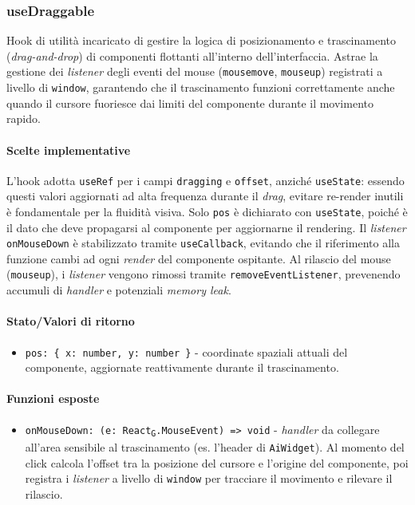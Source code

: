 \documentclass[11pt,a4paper]{article}
\newcommand{\gls}[1]{#1\textsubscript{G}}
\begin{document}
\subsubsection{useDraggable}
Hook di utilità incaricato di gestire la logica di posizionamento e trascinamento (\textit{drag-and-drop}) di componenti flottanti all'interno dell'interfaccia. Astrae la gestione dei \textit{listener} degli eventi del mouse (\texttt{mousemove}, \texttt{mouseup}) registrati a livello di \texttt{window}, garantendo che il trascinamento funzioni correttamente anche quando il cursore fuoriesce dai limiti del componente durante il movimento rapido.

\paragraph{Scelte implementative}
L'hook adotta \texttt{useRef} per i campi \texttt{dragging} e \texttt{offset}, anziché \texttt{useState}: essendo questi valori aggiornati ad alta frequenza durante il \textit{drag}, evitare re-render inutili è fondamentale per la fluidità visiva. Solo \texttt{pos} è dichiarato con \texttt{useState}, poiché è il dato che deve propagarsi al componente per aggiornarne il rendering. Il \textit{listener} \texttt{onMouseDown} è stabilizzato tramite \texttt{useCallback}, evitando che il riferimento alla funzione cambi ad ogni \textit{render} del componente ospitante. Al rilascio del mouse (\texttt{mouseup}), i \textit{listener} vengono rimossi tramite \texttt{removeEventListener}, prevenendo accumuli di \textit{handler} e potenziali \textit{memory leak}.

\paragraph{Stato/Valori di ritorno}
\begin{itemize}
    \item \texttt{pos: \{ x: number, y: number \}} - coordinate spaziali attuali del componente, aggiornate reattivamente durante il trascinamento.
\end{itemize}

\paragraph{Funzioni esposte}
\begin{itemize}
    \item \texttt{onMouseDown: (e: \gls{React}.MouseEvent) => void} - \textit{handler} da collegare all'area sensibile al trascinamento (es. l'header di \texttt{AiWidget}). Al momento del click calcola l'offset tra la posizione del cursore e l'origine del componente, poi registra i \textit{listener} a livello di \texttt{window} per tracciare il movimento e rilevare il rilascio.
\end{itemize}
\end{document}
